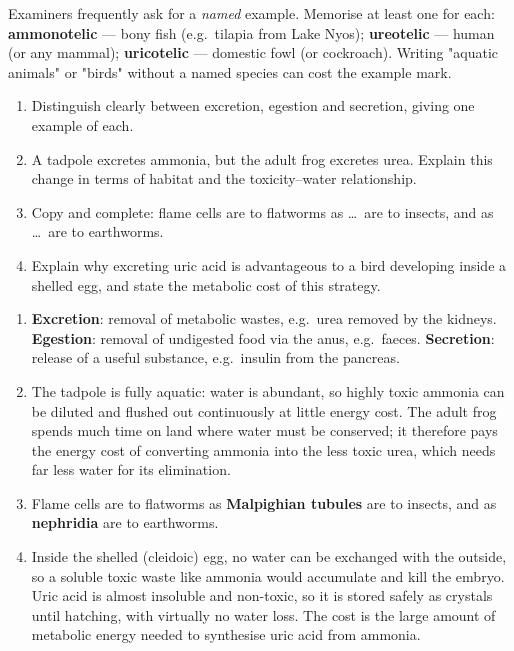 \documentclass[11pt]{article}
\begin{document}
\begin{savaistu}
Examiners frequently ask for a \emph{named} example. Memorise at least one for each: \textbf{ammonotelic} — bony fish (e.g.\ tilapia from Lake Nyos); \textbf{ureotelic} — human (or any mammal); \textbf{uricotelic} — domestic fowl (or cockroach). Writing "aquatic animals" or "birds" without a named species can cost the example mark.
\end{savaistu}

\begin{exercice}
\begin{enumerate}
\item Distinguish clearly between excretion, egestion and secretion, giving one example of each.
\item A tadpole excretes ammonia, but the adult frog excretes urea. Explain this change in terms of habitat and the toxicity--water relationship.
\item Copy and complete: flame cells are to flatworms as \ldots\ are to insects, and as \ldots\ are to earthworms.
\item Explain why excreting uric acid is advantageous to a bird developing inside a shelled egg, and state the metabolic cost of this strategy.
\end{enumerate}
\end{exercice}

\begin{corrige}
\begin{enumerate}
\item \textbf{Excretion}: removal of metabolic wastes, e.g.\ urea removed by the kidneys. \textbf{Egestion}: removal of undigested food via the anus, e.g.\ faeces. \textbf{Secretion}: release of a useful substance, e.g.\ insulin from the pancreas.
\item The tadpole is fully aquatic: water is abundant, so highly toxic ammonia can be diluted and flushed out continuously at little energy cost. The adult frog spends much time on land where water must be conserved; it therefore pays the energy cost of converting ammonia into the less toxic urea, which needs far less water for its elimination.
\item Flame cells are to flatworms as \textbf{Malpighian tubules} are to insects, and as \textbf{nephridia} are to earthworms.
\item Inside the shelled (cleidoic) egg, no water can be exchanged with the outside, so a soluble toxic waste like ammonia would accumulate and kill the embryo. Uric acid is almost insoluble and non-toxic, so it is stored safely as crystals until hatching, with virtually no water loss. The cost is the large amount of metabolic energy needed to synthesise uric acid from ammonia.
\end{enumerate}
\end{corrige}
\end{document}

